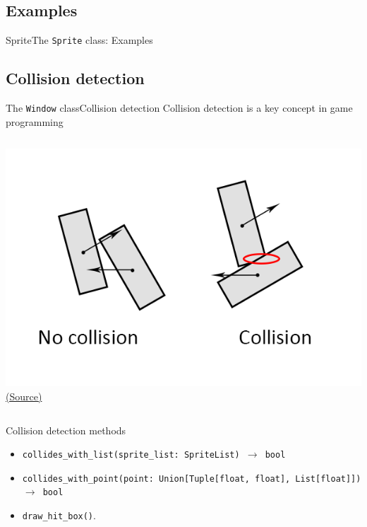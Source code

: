 \documentclass[10pt,compress]{beamer} %
\begin{document}
\subsection{Examples}

\begin{frame}[fragile]{Sprite}{The \texttt{Sprite} class: Examples}
	\begin{exampleblock}{}
	
	\end{exampleblock}
\end{frame}

\subsection{Collision detection}

\begin{frame}{The \texttt{Window} class}{Collision detection}
	\alert{Collision detection} is a key concept in game programming

	\begin{columns}
		\includegraphics[width=\linewidth]{figs/collision}\\
		\tiny \href{https://stackoverflow.com/questions/46268139/2d-collision-detection-without-axis-alignment}{(Source)}
	\end{columns}

	\begin{block}{Collision detection methods}
		\begin{itemize}
		\item \footnotesize{\texttt{collides\_with\_list(sprite\_list: SpriteList) $\rightarrow$ bool}} 
		\item \footnotesize{\texttt{collides\_with\_point(point: Union[Tuple[float, float], List[float]]) $\rightarrow$ bool}} 
		\item \footnotesize{\texttt{draw\_hit\_box()}}. 
		\end{itemize}
	\end{block}	
\end{frame}
\end{document}

